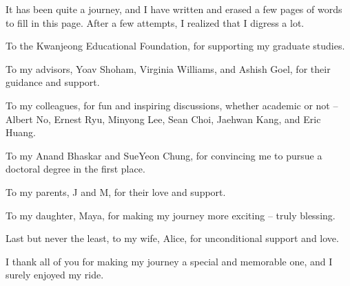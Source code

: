 It has been quite a journey, and I have written and erased a few pages of words to fill in this page. After a few attempts, I realized that I digress a lot. 

To the Kwanjeong Educational Foundation, for supporting my graduate studies.

To my advisors, Yoav Shoham, Virginia Williams, and Ashish Goel, for their guidance and support. 

To my colleagues, for fun and inspiring discussions, whether academic or not -- Albert No, Ernest Ryu, Minyong Lee, Sean Choi, Jaehwan Kang, and Eric Huang. 

To my Anand Bhaskar and SueYeon Chung, for convincing me to pursue a doctoral degree in the first place. 

To my parents, J and M, for their love and support. 

To my daughter, Maya, for making my journey more exciting -- truly blessing. 

Last but never the least, to my wife, Alice, for unconditional support and love.

I thank all of you for making my journey a special and memorable one, and I surely enjoyed my ride. 



%
%



